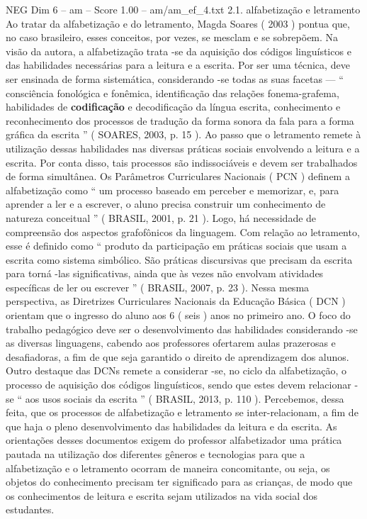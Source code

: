 \begin{textsample}{NEG Dim 6 – am – Score 1.00 – am/am\_ef\_4.txt}  \label{ex:f6_neg_028}
2.1. alfabetização e letramento Ao tratar da alfabetização e do letramento, Magda Soares ( 2003 ) pontua que, no caso brasileiro, esses conceitos, por vezes, se mesclam e se sobrepõem.
Na visão da autora, a alfabetização trata -se da aquisição dos códigos linguísticos e das habilidades necessárias para a leitura e a escrita.
Por ser uma técnica, deve ser ensinada de forma sistemática, considerando -se todas as suas facetas — “ consciência fonológica e fonêmica, identificação das relações fonema-grafema, habilidades de \textbf{codificação} e decodificação da língua escrita, conhecimento e reconhecimento dos processos de tradução da forma sonora da fala para a forma gráfica da escrita ” ( SOARES, 2003, p. 15 ).
Ao passo que o letramento remete à utilização dessas habilidades nas diversas práticas sociais envolvendo a leitura e a escrita.
Por conta disso, tais processos são indissociáveis e devem ser trabalhados de forma simultânea.
Os Parâmetros Curriculares Nacionais ( PCN ) definem a alfabetização como “ um processo baseado em perceber e memorizar, e, para aprender a ler e a escrever, o aluno precisa construir um conhecimento de natureza conceitual ” ( BRASIL, 2001, p. 21 ).
Logo, há necessidade de compreensão dos aspectos grafofônicos da linguagem.
Com relação ao letramento, esse é definido como “ produto da participação em práticas sociais que usam a escrita como sistema simbólico.
São práticas discursivas que precisam da escrita para torná -las significativas, ainda que às vezes não envolvam atividades específicas de ler ou escrever ” ( BRASIL, 2007, p. 23 ).
Nessa mesma perspectiva, as Diretrizes Curriculares Nacionais da Educação Básica ( DCN ) orientam que o ingresso do aluno aos 6 ( seis ) anos no primeiro ano.
O foco do trabalho pedagógico deve ser o desenvolvimento das habilidades considerando -se as diversas linguagens, cabendo aos professores ofertarem aulas prazerosas e desafiadoras, a fim de que seja garantido o direito de aprendizagem dos alunos.
Outro destaque das DCNs remete a considerar -se, no ciclo da alfabetização, o processo de aquisição dos códigos linguísticos, sendo que estes devem relacionar -se “ aos usos sociais da escrita ” ( BRASIL, 2013, p. 110 ).
Percebemos, dessa feita, que os processos de alfabetização e letramento se inter-relacionam, a fim de que haja o pleno desenvolvimento das habilidades da leitura e da escrita.
As orientações desses documentos exigem do professor alfabetizador uma prática pautada na utilização dos diferentes gêneros e tecnologias para que a alfabetização e o letramento ocorram de maneira concomitante, ou seja, os objetos do conhecimento precisam ter significado para as crianças, de modo que os conhecimentos de leitura e escrita sejam utilizados na vida social dos estudantes.

\end{textsample}
